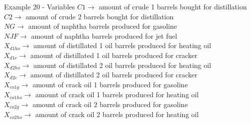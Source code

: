 \begin{frame}{Example 20 - Variables}
\small{
$C1  \longrightarrow$ amount of crude 1 barrels bought for distillation \\
$C2  \longrightarrow$ amount of crude 2 barrels bought for distillation \\
$NG  \longrightarrow$ amount of naphtha barrels produced for gasoline \\
$NJF \longrightarrow$ amount of naphtha barrels produced for jet fuel \\
$X_{d1ho} \longrightarrow$ amount of distillated 1 oil barrels produced for heating oil \\
$X_{d1c} \longrightarrow$ amount of distillated 1 oil barrels produced for cracker \\
$X_{d2ho} \longrightarrow$ amount of distillated 2 oil barrels produced for heating oil \\
$X_{d2c} \longrightarrow$ amount of distillated 2 oil barrels produced for cracker \\
$X_{co1g} \longrightarrow$ amount of crack oil 1 barrels produced for gasoline \\
$X_{co1ho} \longrightarrow$ amount of crack oil 1 barrels produced for heating oil \\
$X_{co2g} \longrightarrow$ amount of crack oil 2 barrels produced for gasoline \\
$X_{co2ho} \longrightarrow$ amount of crack oil 2 barrels produced for heating oil
}
\end{frame}

